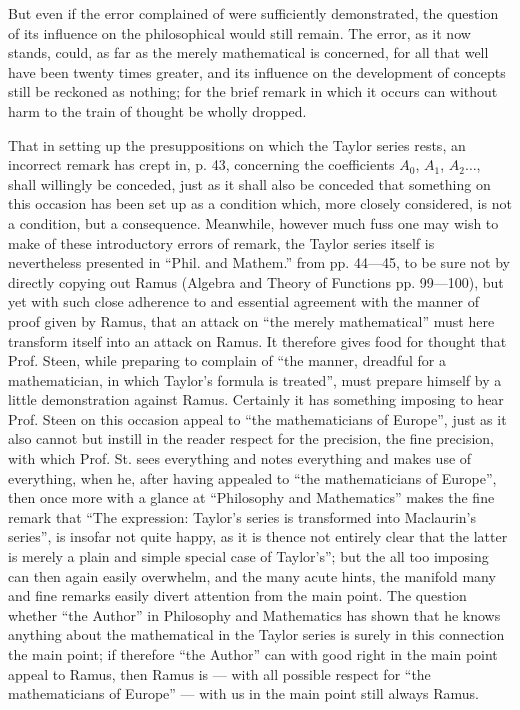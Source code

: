 \documentclass[12pt,a4paper,openany]{book}
\newcommand{\opage}[1]{\marginnote{\footnotesize\textit{[#1]}}}
\begin{document}
But even if the error complained of were sufficiently
demonstrated, the question of its influence on the
philosophical would still remain. The error, as it
now stands, could, as far as the merely mathematical is concerned, for all that
well have been twenty times greater, and its
influence on the development of concepts still be reckoned as
nothing; for the brief remark in which it occurs
can without harm to the train of thought be wholly dropped.

That in setting up the presuppositions on which the Taylor series
rests, an incorrect remark has crept in, p. 43, concerning the coefficients $A_{0}$, $A_{1}$, $A_{2}\dots$, shall willingly be conceded, just as it shall also be conceded that something
on this occasion has been set up as a condition which,
more closely considered, is not a condition, but a consequence.
\opage{15}\setcounter{footnote}{0}%
Meanwhile, however much fuss one may wish to make of these introductory errors of remark, the Taylor series itself is nevertheless
presented in ``Phil. and Mathem.'' from pp. 44---45, to be sure not by directly copying out Ramus
(Algebra and Theory of Functions pp. 99---100), but yet with
such close adherence to and essential agreement
with the manner of proof given by Ramus, that an attack
on ``the merely mathematical'' must here transform itself into an
attack on Ramus. It therefore gives food for thought that
Prof. Steen, while preparing to complain of
``the manner, dreadful for a mathematician, in which Taylor's formula is treated'', must prepare himself
by a little demonstration against Ramus. Certainly it has
something imposing to hear Prof. Steen on this
occasion appeal to ``the mathematicians of Europe'', just as
it also cannot but instill in the reader respect for
the precision, the fine precision, with which Prof. St. sees everything and notes everything and makes use of everything,
when he, after having appealed to ``the mathematicians of Europe'', then once more with a glance at ``Philosophy and
Mathematics'' makes the fine remark that ``The expression:
Taylor's series is transformed into Maclaurin's series'', is insofar not quite happy, as it is thence not entirely
clear that the latter is merely a plain and simple special case
of Taylor's''; but the all too imposing can then again
easily overwhelm, and the many acute hints, the
manifold many and fine remarks easily divert attention from the main point. The question whether
``the Author'' in Philosophy and Mathematics has shown that he
knows anything about the mathematical in the Taylor series
is surely in this connection the main point; if therefore
``the Author'' can with good right in the main point appeal to
Ramus, then Ramus is --- with all possible respect for
``the mathematicians of Europe'' --- with us in the main point still always Ramus.
\end{document}
